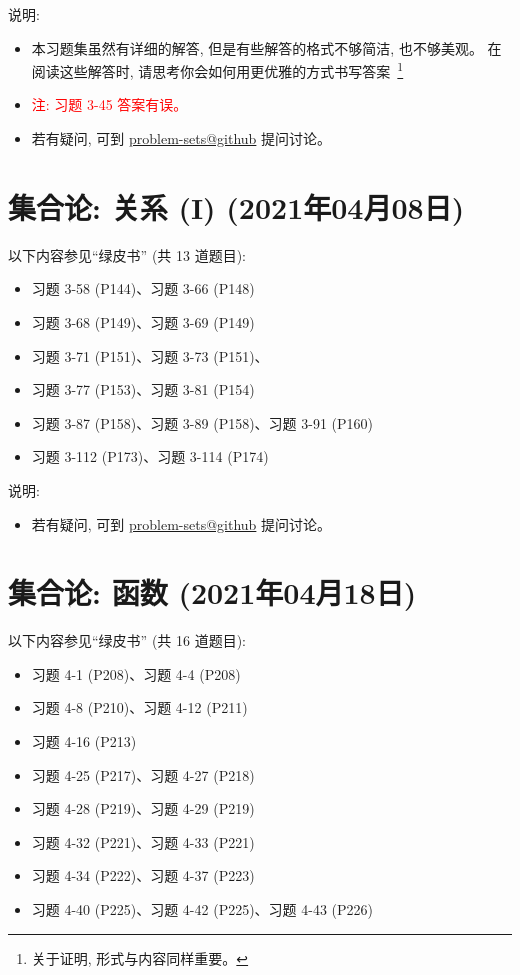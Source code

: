 \documentclass{article}
\begin{document}
说明:
\begin{itemize}
  \item 本习题集虽然有详细的解答, 但是有些解答的格式不够简洁, 也不够美观。
    在阅读这些解答时, 请思考你会如何用更优雅的方式书写答案~\footnote{关于证明, 形式与内容同样重要。}
  \item \textcolor{red}{注: 习题 3-45 答案有误。}
  \item 若有疑问, 可到 \href{https://github.com/courses-at-nju-by-hfwei/discrete-math-problem-sets/discussions}{problem-sets@github} 提问讨论。
\end{itemize}
\section{集合论: 关系 (I) (2021年04月08日)}

以下内容参见``绿皮书'' (共 13 道题目):
\begin{itemize}
  \item 习题 3-58 (P144)、习题 3-66 (P148)
  \item 习题 3-68 (P149)、习题 3-69 (P149)
  \item 习题 3-71 (P151)、习题 3-73 (P151)、
  \item 习题 3-77 (P153)、习题 3-81 (P154)
  \item 习题 3-87 (P158)、习题 3-89 (P158)、习题 3-91 (P160)
  \item 习题 3-112 (P173)、习题 3-114 (P174)
\end{itemize}

说明:
\begin{itemize}
  \item 若有疑问, 可到 \href{https://github.com/courses-at-nju-by-hfwei/discrete-math-problem-sets/discussions}{problem-sets@github} 提问讨论。
\end{itemize}
\section{集合论: 函数 (2021年04月18日)}

以下内容参见``绿皮书'' (共 16 道题目):
\begin{itemize}
  \item 习题 4-1 (P208)、习题 4-4 (P208)
  \item 习题 4-8 (P210)、习题 4-12 (P211)
  \item 习题 4-16 (P213)
  \item 习题 4-25 (P217)、习题 4-27 (P218)
  \item 习题 4-28 (P219)、习题 4-29 (P219)
  \item 习题 4-32 (P221)、习题 4-33 (P221)
  \item 习题 4-34 (P222)、习题 4-37 (P223)
  \item 习题 4-40 (P225)、习题 4-42 (P225)、习题 4-43 (P226)
\end{itemize}
\end{document}
